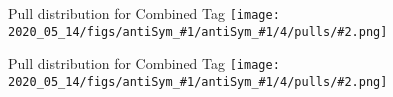 
\newcommand{\pull}[3]{
\begin{frame}{Pull distribution for #3}
\texttt{[image: 2020\_05\_14/figs/antiSym\_\#1/antiSym\_\#1/4/pulls/\#2.png]}
\end{frame}

}

\pull{chebyshev}{Comb}{Combined Tag}
\pull{simple}{Comb}{Combined Tag}